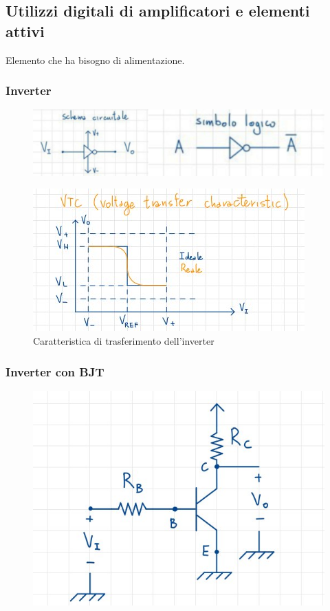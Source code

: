 \documentclass[11pt,a4paper,]{article}
\begin{document}
\subsection{Utilizzi digitali di amplificatori e elementi attivi}
\begin{definizione}
    Elemento che ha bisogno di alimentazione.
\end{definizione}
\subsubsection{Inverter}
\begin{figure}[H]
    \centering
    \includegraphics[width=0.4\linewidth]{img/inv.png}
\end{figure}
\begin{figure}[H]
    \centering
    \includegraphics[width=0.3\linewidth]{img/car trasf invert.png}
    \caption{Caratteristica di trasferimento dell'inverter}
\end{figure}
\subsubsection{Inverter con BJT}
\begin{figure}[H]
    \centering
    \includegraphics[width=0.3\linewidth]{img/inv bjt.png}
\end{figure}
\end{document}
